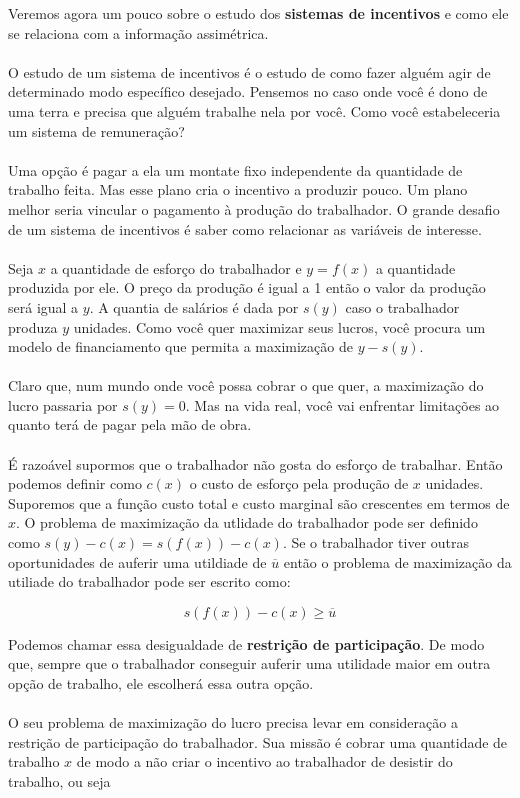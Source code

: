 \documentclass[a4paper,11pt,oneside]{book}
\theoremstyle{definition}
\theoremstyle{break}
\begin{document}
Veremos agora um pouco sobre o estudo dos \textbf{sistemas de incentivos} e como ele se relaciona com a informação assimétrica.
\\~\\
O estudo de um sistema de incentivos é o estudo de como fazer alguém agir de determinado modo específico desejado. Pensemos no caso onde você é dono de uma terra e precisa que alguém trabalhe nela por você. Como você estabeleceria um sistema de remuneração?
\\~\\
Uma opção é pagar a ela um montate fixo independente da quantidade de trabalho feita. Mas esse plano cria o incentivo a produzir pouco. Um plano melhor seria vincular o pagamento à produção do trabalhador. O grande desafio de um sistema de incentivos é saber como relacionar as variáveis de interesse.
\\~\\
Seja $x$ a quantidade de esforço do trabalhador e $y = f(x)$ a quantidade produzida por ele. O preço da produção é igual a 1 então o valor da produção será igual a $y$. A quantia de salários é dada por $s(y)$ caso o trabalhador produza $y$ unidades. Como você quer maximizar seus lucros, você procura um modelo de financiamento que permita a maximização de $y - s(y)$.
\\~\\
Claro que, num mundo onde você possa cobrar o que quer, a maximização do lucro passaria por $s(y) = 0$. Mas na vida real, você vai enfrentar limitações ao quanto terá de pagar pela mão de obra.
\\~\\
É razoável supormos que o trabalhador não gosta do esforço de trabalhar. Então podemos definir como $c(x)$ o custo de esforço pela produção de $x$ unidades. Suporemos que a função custo total e custo marginal são crescentes em termos de $x$. O problema de maximização da utlidade do trabalhador pode ser definido como $s(y) - c(x) = s(f(x)) - c(x)$. Se o trabalhador tiver outras oportunidades de auferir uma utildiade de $\overline{u}$ então o problema de maximização da utiliade do trabalhador pode ser escrito como:

$$ s(f(x)) - c(x) \geq \overline{u} $$

Podemos chamar essa desigualdade de \textbf{restrição de participação}. De modo que, sempre que o trabalhador conseguir auferir uma utilidade maior em outra opção de trabalho, ele escolherá essa outra opção.
\\~\\
O seu problema de maximização do lucro precisa levar em consideração a restrição de participação do trabalhador. Sua missão é cobrar uma quantidade de trabalho $x$ de modo a não criar o incentivo ao trabalhador de desistir do trabalho, ou seja
\end{document}
